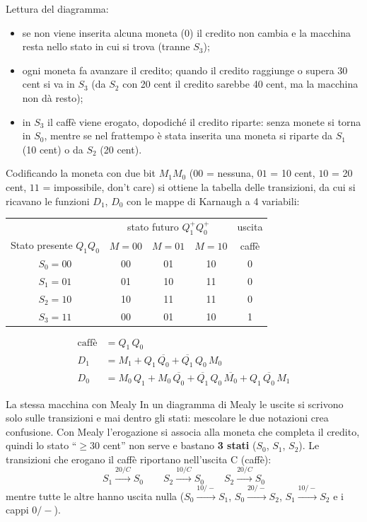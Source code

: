 \noindent Lettura del diagramma:
\begin{itemize}[leftmargin=1.5em, itemsep=2pt]
    \item se non viene inserita alcuna moneta (0) il credito non cambia e la macchina resta
          nello stato in cui si trova (tranne $S_3$);
    \item ogni moneta fa avanzare il credito; quando il credito raggiunge o supera
          30 cent si va in $S_3$ (da $S_2$ con 20 cent il credito sarebbe 40 cent, ma la
          macchina non dà resto);
    \item in $S_3$ il caffè viene erogato, dopodiché il credito riparte: senza monete si
          torna in $S_0$, mentre se nel frattempo è stata inserita una moneta si riparte da
          $S_1$ (10 cent) o da $S_2$ (20 cent).
\end{itemize}

\noindent Codificando la moneta con due bit $M_1M_0$ ($00$ = nessuna, $01$ = 10 cent,
$10$ = 20 cent, $11$ = impossibile, don't care) si ottiene la tabella delle transizioni,
da cui si ricavano le funzioni $D_1$, $D_0$ con le mappe di Karnaugh a 4 variabili:

\begin{center}
\begin{tabular}{c|ccc|c}
\toprule
 & \multicolumn{3}{c|}{stato futuro $Q_1^+Q_0^+$} & uscita \\
Stato presente $Q_1Q_0$ & $M=00$ & $M=01$ & $M=10$ & caffè \\
\midrule
$S_0 = 00$ & 00 & 01 & 10 & 0 \\
$S_1 = 01$ & 01 & 10 & 11 & 0 \\
$S_2 = 10$ & 10 & 11 & 11 & 0 \\
$S_3 = 11$ & 00 & 01 & 10 & 1 \\
\bottomrule
\end{tabular}
\end{center}

\begin{align*}
\text{caffè} &= Q_1\,Q_0 \\
D_1 &= M_1 + Q_1\,\overline{Q_0} + \overline{Q_1}\,Q_0\,M_0 \\
D_0 &= M_0\,Q_1 + M_0\,\overline{Q_0} + \overline{Q_1}\,Q_0\,\overline{M_0} + Q_1\,\overline{Q_0}\,M_1
\end{align*}

\begin{osservazione}{La stessa macchina con Mealy}
In un diagramma di Mealy le uscite si scrivono solo sulle transizioni e mai dentro gli
stati: mescolare le due notazioni crea confusione. Con Mealy l'erogazione si associa alla
moneta che completa il credito, quindi lo stato ``$\geq 30$ cent'' non serve e bastano
\textbf{3 stati} ($S_0$, $S_1$, $S_2$). Le transizioni che erogano il caffè riportano
nell'uscita C (caffè):
\[
S_1 \xrightarrow{20/C} S_0 \qquad S_2 \xrightarrow{10/C} S_0 \qquad S_2 \xrightarrow{20/C} S_0
\]
mentre tutte le altre hanno uscita nulla ($S_0 \xrightarrow{10/-} S_1$,
$S_0 \xrightarrow{20/-} S_2$, $S_1 \xrightarrow{10/-} S_2$ e i cappi $0/-$).
\end{osservazione}

